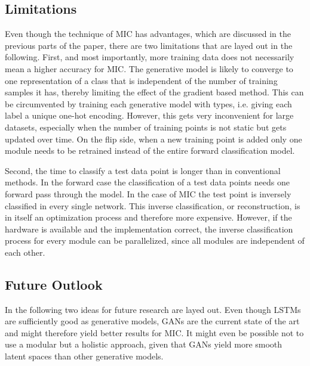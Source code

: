 \documentclass{article}
\begin{document}
\subsection{Limitations}

Even though the technique of MIC has advantages, which are discussed in the previous parts of the paper, there are two limitations that are layed out in the following. 
First, and most importantly, more training data does not necessarily mean a higher accuracy for MIC. The generative model is likely to converge to one representation of a class that is independent of the number of training samples it has, thereby limiting the effect of the gradient based method. This can be circumvented by training each generative model with types, i.e. giving each label a unique one-hot encoding. However, this gets very inconvenient for large datasets, especially when the number of training points is not static but gets updated over time. On the flip side, when a new training point is added only one module needs to be retrained instead of the entire forward classification model. 

Second, the time to classify a test data point is longer than in conventional methods. In the forward case the classification of a test data points needs one forward pass through the model. In the case of MIC the test point is inversely classified in every single network. This inverse classification, or reconstruction, is in itself an optimization process and therefore more expensive. However, if the hardware is available and the implementation correct, the inverse classification process for every module can be parallelized, since all modules are independent of each other.  


\subsection{Future Outlook}

In the following two ideas for future research are layed out. 
Even though LSTMs are sufficiently good as generative models, GANs are the current state of the art and might therefore yield better results for MIC. It might even be possible not to use a modular but a holistic approach, given that GANs yield more smooth latent spaces than other generative models.
\end{document}
